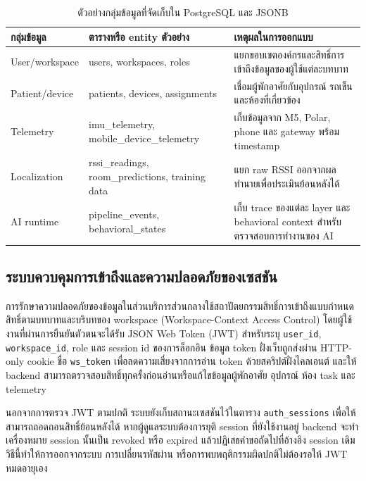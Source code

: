 \begin{table}[H]
    \centering
    \caption{ตัวอย่างกลุ่มข้อมูลที่จัดเก็บใน PostgreSQL และ JSONB}
    \label{tab:ch3_database_groups}
    \small
    \renewcommand{\arraystretch}{1.2}
    \begin{tabular}{|L{3.0cm}|L{4.4cm}|L{5.1cm}|}
        \hline
        \textbf{กลุ่มข้อมูล} & \textbf{ตารางหรือ entity ตัวอย่าง} & \textbf{เหตุผลในการออกแบบ} \\ \hline
        User/workspace & users, workspaces, roles & แยกขอบเขตองค์กรและสิทธิ์การเข้าถึงข้อมูลของผู้ใช้แต่ละบทบาท \\ \hline
        Patient/device & patients, devices, assignments & เชื่อมผู้พักอาศัยกับอุปกรณ์ รถเข็น และห้องที่เกี่ยวข้อง \\ \hline
        Telemetry & imu\_telemetry, mobile\_device\_telemetry & เก็บข้อมูลจาก M5, Polar, phone และ gateway พร้อม timestamp \\ \hline
        Localization & rssi\_readings, room\_predictions, training data & แยก raw RSSI ออกจากผลทำนายเพื่อประเมินย้อนหลังได้ \\ \hline
        AI runtime & pipeline\_events, behavioral\_states & เก็บ trace ของแต่ละ layer และ behavioral context สำหรับตรวจสอบการทำงานของ AI \\ \hline
    \end{tabular}
\end{table}

\subsection*{\thesubsection\quad ระบบควบคุมการเข้าถึงและความปลอดภัยของเซสชัน}
\label{sec:ch3_session_security}
การรักษาความปลอดภัยของข้อมูลในส่วนบริการส่วนกลางใช้สถาปัตยกรรมสิทธิ์การเข้าถึงแบบกำหนดสิทธิ์ตามบทบาทและบริบทของ workspace (Workspace-Context Access Control) โดยผู้ใช้งานที่ผ่านการยืนยันตัวตนจะได้รับ JSON Web Token (JWT) สำหรับระบุ \texttt{user\_id}, \texttt{workspace\_id}, role และ session id ของการล็อกอิน ข้อมูล token ฝั่งเว็บถูกส่งผ่าน HTTP-only cookie ชื่อ \texttt{ws\_token} เพื่อลดความเสี่ยงจากการอ่าน token ด้วยสคริปต์ฝั่งไคลเอนต์ และให้ backend สามารถตรวจสอบสิทธิ์ทุกครั้งก่อนอ่านหรือแก้ไขข้อมูลผู้พักอาศัย อุปกรณ์ ห้อง task และ telemetry

นอกจากการตรวจ JWT ตามปกติ ระบบยังเก็บสถานะเซสชันไว้ในตาราง \texttt{auth\_sessions} เพื่อให้สามารถถอดถอนสิทธิ์ย้อนหลังได้ หากผู้ดูแลระบบต้องการยุติ session ที่ยังใช้งานอยู่ backend จะทำเครื่องหมาย session นั้นเป็น revoked หรือ expired แล้วปฏิเสธคำขอถัดไปที่อ้างอิง session เดิม วิธีนี้ทำให้การออกจากระบบ การเปลี่ยนรหัสผ่าน หรือการพบพฤติกรรมผิดปกติไม่ต้องรอให้ JWT หมดอายุเอง


